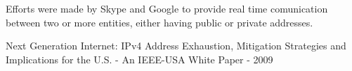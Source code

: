 \documentclass[11pt,twocolumn]{article}
\begin{document}
Efforts were made by Skype and Google to provide real time comunication between two or more entities, either having public or private addresses.

\begin{thebibliography}{9}


 Next Generation Internet: IPv4 Address Exhaustion, Mitigation Strategies and Implications for the U.S. - An IEEE-USA White Paper - 2009





\end{thebibliography}
\end{document}
